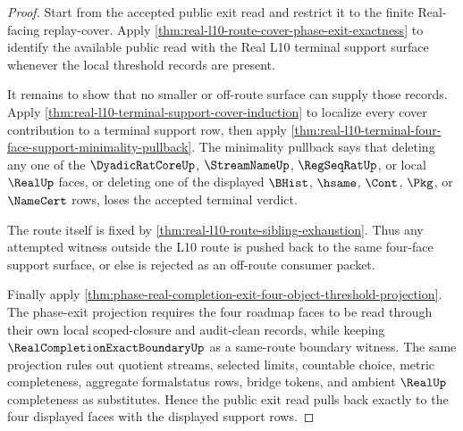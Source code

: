 \begin{proof}
Start from the accepted public exit read and restrict it to the finite
Real-facing replay-cover. Apply
\autoref{thm:real-l10-route-cover-phase-exit-exactness} to identify the
available public read with the Real L10 terminal support surface whenever the
local threshold records are present.

It remains to show that no smaller or off-route surface can supply those
records. Apply \autoref{thm:real-l10-terminal-support-cover-induction} to
localize every cover contribution to a terminal support row, then apply
\autoref{thm:real-l10-terminal-four-face-support-minimality-pullback}. The
minimality pullback says that deleting any one of the
$\DyadicRatCoreUp$, $\StreamNameUp$, $\RegSeqRatUp$, or local $\RealUp$ faces,
or deleting one of the displayed $\BHist$, $\hsame$, $\Cont$, $\Pkg$, or
$\NameCert$ rows, loses the accepted terminal verdict.

The route itself is fixed by
\autoref{thm:real-l10-route-sibling-exhaustion}. Thus any attempted witness
outside the L10 route is pushed back to the same four-face support surface, or
else is rejected as an off-route consumer packet.

Finally apply
\autoref{thm:phase-real-completion-exit-four-object-threshold-projection}.
The phase-exit projection requires the four roadmap faces to be read through
their own local scoped-closure and audit-clean records, while keeping
$\RealCompletionExactBoundaryUp$ as a same-route boundary witness. The same
projection rules out quotient streams, selected limits, countable choice,
metric completeness, aggregate formalstatus rows, bridge tokens, and ambient
$\RealUp$ completeness as substitutes. Hence the public exit read pulls back
exactly to the four displayed faces with the displayed support rows.
\end{proof}

